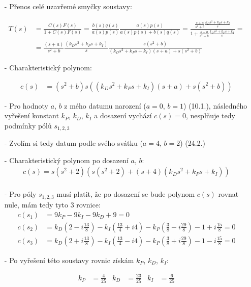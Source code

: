 \documentclass{article}
\begin{document}
\begin{itemize}
    \item[-] Přenos celé uzavřemé smyčky soustavy:

    \begin{align*}
        T(s) &=  \frac{C(s)F(s)}{1+C(s)F(s)} = \frac{b(s)q(s)}{a(s)p(s)}\frac{a(s)p(s)}{a(s)p(s)+b(s)q(s)} = \frac{\frac{s+a}{s^2+b}\frac{k_Ds^2+k_Ps+k_I}{s}}{1+\frac{s+a}{s^2+b}\frac{k_Ds^2+k_Ps+k_I}{s}} =\\
        &=\frac{(s+a)}{s^2+b}\frac{(k_Ds^2+k_Ps+k_I)}{s}\frac{s(s^2+b)}{(k_Ds^2+k_Ps+k_I)(s+a)+s(s^2+b)}
    \end{align*}

    \item[-] Charakteristický polynom: 
    
    \begin{align*}
        c(s) &= (s^2+b)s((k_Ds^2+k_Ps+k_I)(s+a)+s(s^2+b))
    \end{align*}

    \item[-] Pro hodnoty $a$, $b$ z mého datumu narození ($a=0$, $b=1$) (10.1.), následného vyřešení konstant $k_P$, $k_D$, $k_I$ a dosazení vychází $c(s)=0$, nesplňuje tedy podmínky pólů $s_{1,2,3}$

    \item[-] Zvolím si tedy datum podle svého svátku ($a=4$, $b=2$) (24.2.)
    \item[-] Charakteristický polynom po dosazení $a$, $b$: 
    \begin{align*}
        c(s) = s(s^2 + 2)(s(s^2 + 2) + (s + 4)(k_Ds^2 + k_Ps + k_I))\\
    \end{align*}
    \item[-] Pro póly $s_{1,2,3}$ musí platit, že po dosazení se bude polynom $c(s)$ rovnat nule, mám tedy tyto 3 rovnice:
    \begin{align*}
        c(s_1) &= 9k_P - 9k_I - 9k_D + 9 = 0\\
        c(s_2) &= k_D(2 - i\frac{13}{8}) - k_I(\frac{13}{4}+ i4) - k_P(\frac{3}{8} - i\frac{29}{8}) - 1 + i\frac{15}{8} = 0\\
        c(s_3) &= k_D(2 + i\frac{13}{8}) - k_I(\frac{13}{4}- i4) - k_P(\frac{3}{8} + i\frac{29}{8}) - 1 - i\frac{15}{8} = 0
    \end{align*}

    \item[-] Po vyřešení této soustavy rovnic získám $k_P$, $k_D$, $k_I$:

    \begin{align*}
        k_P&= \frac{4}{25} & k_D&=\frac{23}{25} & k_I&=\frac{6}{25}
    \end{align*}


\end{itemize}
\end{document}
